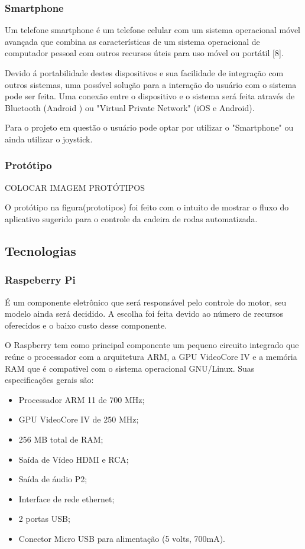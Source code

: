 \subsubsection{Smartphone}
Um telefone smartphone é um telefone celular com um sistema operacional móvel avançada que combina as características de um sistema operacional de computador pessoal com outros recursos úteis para uso móvel ou portátil [8].

Devido á portabilidade destes dispositivos e sua facilidade de integração com outros sistemas, uma possível solução para a interação do usuário com o sistema pode ser feita. Uma conexão entre o dispositivo e o sistema será feita através de Bluetooth (Android ) ou "Virtual Private Network" (iOS e Android).

Para o projeto em questão o usuário pode optar por utilizar o "Smartphone" ou ainda utilizar o joystick.

\subsubsection{Protótipo}

COLOCAR IMAGEM PROTÓTIPOS

O protótipo na figura(prototipos) foi feito com o intuito de mostrar o fluxo do aplicativo sugerido para o controle da cadeira de rodas automatizada.

\subsection{Tecnologias}

\subsubsection{Raspeberry Pi}

É um componente eletrônico que será responsável pelo controle do motor, seu modelo ainda será decidido. A escolha foi feita devido ao número de recursos oferecidos e o baixo custo desse componente.

O Raspberry  tem como principal componente um pequeno circuito integrado que reúne o processador com a arquitetura ARM, a GPU VideoCore IV e a memória RAM que é compativel com o sistema operacional GNU/Linux. Suas especificações gerais são:

\begin{itemize}
 \item Processador ARM 11 de 700 MHz;
 \item GPU VideoCore IV de 250 MHz;
 \item 256 MB total de RAM;
 \item Saída de Vídeo HDMI e RCA;
 \item Saída de áudio P2;
 \item Interface de rede ethernet;
 \item 2 portas USB;
 \item Conector Micro USB para alimentação (5 volts, 700mA).
\end{itemize}

